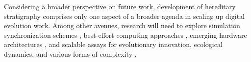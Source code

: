 Considering a broader perspective on future work, development of hereditary stratigraphy comprises only one aspect of a broader agenda in scaling up digital evolution work.
Among other avenues, research will need to explore simulation synchronization schemes \citep{fujimoto1990parallel}, best-effort computing approaches \citep{moreno2022best,ackley2020best}, emerging hardware architectures \citep{moreno2024trackable,chan2018lenia,heinemann2008artificial}, and scalable assays for evolutionary innovation, ecological dynamics, and various forms of complexity \citep{bedau1998classification,dolson2019modes,moreno2024methods,moreno2024case,moreno2024ecology}.
